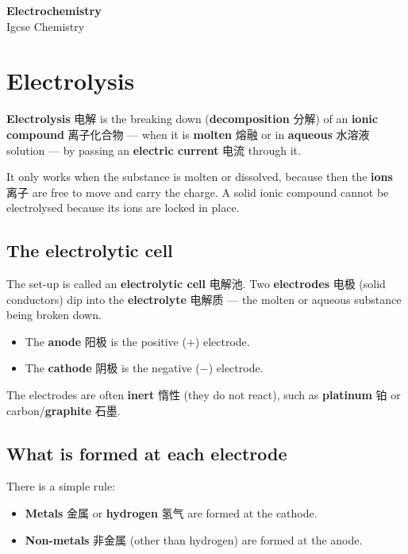\documentclass[11pt]{article}
\begin{document}
\begin{center}
  {\LARGE\bfseries Electrochemistry}\\[0.35em]
  {\large Igcse Chemistry}
\end{center}
\vspace{0.6em}

\section*{Electrolysis}

\textbf{Electrolysis} 电解 is the breaking down (\textbf{decomposition} 分解) of an \textbf{ionic compound} 离子化合物 — when it is \textbf{molten} 熔融 or in \textbf{aqueous} 水溶液 solution — by passing an \textbf{electric current} 电流 through it.

It only works when the substance is molten or dissolved, because then the \textbf{ions} 离子 are free to move and carry the charge. A solid ionic compound cannot be electrolysed because its ions are locked in place.

\subsection*{The electrolytic cell}

The set-up is called an \textbf{electrolytic cell} 电解池. Two \textbf{electrodes} 电极 (solid conductors) dip into the \textbf{electrolyte} 电解质 — the molten or aqueous substance being broken down.

\begin{itemize}
\item The \textbf{anode} 阳极 is the positive ($+$) electrode.

\item The \textbf{cathode} 阴极 is the negative ($-$) electrode.

\end{itemize}

The electrodes are often \textbf{inert} 惰性 (they do not react), such as \textbf{platinum} 铂 or carbon/\textbf{graphite} 石墨.

\subsection*{What is formed at each electrode}

There is a simple rule:

\begin{itemize}
\item \textbf{Metals} 金属 or \textbf{hydrogen} 氢气 are formed at the cathode.

\item \textbf{Non-metals} 非金属 (other than hydrogen) are formed at the anode.

\end{itemize}
\end{document}
